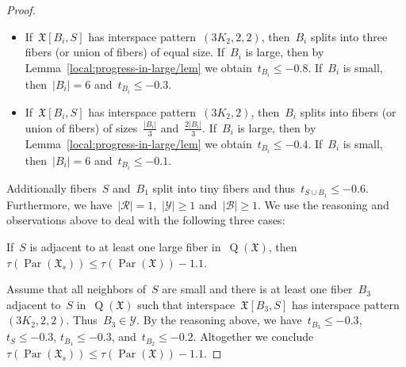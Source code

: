 \documentclass[english,a4paper]{article}
\theoremstyle{plain}
\theoremstyle{definition}
\newcommand{\abs}[1]{| #1 |}
\newcommand{\coherentConfig}{\ensuremath{\mathfrak{X}}}
\newcommand{\interspace}[2]{\ensuremath{\coherentConfig[#1,#2]}}
\DeclareMathOperator*{\Quotient}{Q}
\newcommand{\quotientGraph}[1]{\ensuremath{\Quotient(#1)}}
\DeclareMathOperator{\parameters}{Par}
\newcommand{\ipsixMatching}             {\ensuremath{(\disjointCliques{3}{2},2)}}
\newcommand{\ipsixMatchingTwice}        {\ensuremath{(\disjointCliques{3}{2},2,2)}}
\newcommand{\clique}[1]{\ensuremath{K_{#1}}}
\newcommand{\disjointCliques}[2]{\ensuremath{#1 \clique{#2}}}
\begin{document}
\begin{proof}
\begin{itemize}
        \item
        If~$\interspace{B_i}{S}$ has interspace pattern~$\ipsixMatchingTwice$, then~$B_i$ splits into three fibers (or union of fibers) of equal size.
        If~$B_i$ is large, then by Lemma~\ref{local:progress-in-large/lem} we obtain~$t_{B_i} \leq -0.8$.
        If~$B_i$ is small, then~$|B_i| = 6$ and~$t_{B_i} \leq -0.3$.

        \item
        If~$\interspace{B_i}{S}$ has interspace pattern~$\ipsixMatching$, then~$B_i$ splits into fibers (or union of fibers) of sizes~$\frac{\abs{B_i}}{3}$ and~$\frac{2\abs{B_i}}{3}$.
        If~$B_i$ is large, then by Lemma~\ref{local:progress-in-large/lem} we obtain~$t_{B_i} \leq -0.4$.
        If~$B_i$ is small, then~$|B_i| = 6$ and~$t_{B_i} \leq - 0.1$.
    \end{itemize}
    Additionally fibers~$S$ and~$B_1$ split into tiny fibers and thus~$t_{S \cup B_1} \leq -0.6$.
    Furthermore, we have~$\abs{\mathcal{R}} = 1$,~$\abs{\mathcal{Y}} \geq 1$ and~$\abs{\mathcal{B}} \geq 1$.
    We use the reasoning and observations above to deal with the following three cases:

    If~$S$ is adjacent to at least one large fiber in~$\quotientGraph{\coherentConfig}$, then~$\tau(\parameters(\coherentConfig_s)) \leq \tau(\parameters(\coherentConfig))- 1.1$.

    Assume that all neighbors of~$S$ are small and there is at least one fiber~$B_3$ adjacent to~$S$ in~$\quotientGraph{\coherentConfig}$ such that interspace~$\interspace{B_3}{S}$ has interspace pattern~$\ipsixMatchingTwice$.
    Thus~$B_3 \in \mathcal{Y}$.
    By the reasoning above, we have~$t_{B_3} \leq -0.3$, $t_S \leq -0.3$, $t_{B_1} \leq -0.3$, and~$t_{B_2} \leq -0.2$.
    Altogether we conclude~$\tau(\parameters(\coherentConfig_s)) \leq \tau(\parameters(\coherentConfig))- 1.1$.


\end{proof}
\end{document}
